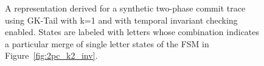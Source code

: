 \begin{figure}[!t]
  \caption{A representation derived for a synthetic two-phase commit
    trace using GK-Tail with k=1 and with temporal invariant checking
    enabled. States are labeled with letters whose combination
    indicates a particular merge of single letter states of the FSM in
    Figure~\ref{fig:2pc_k2_inv}.}
  \label{fig:2pc_k1_inv}
\end{figure}

